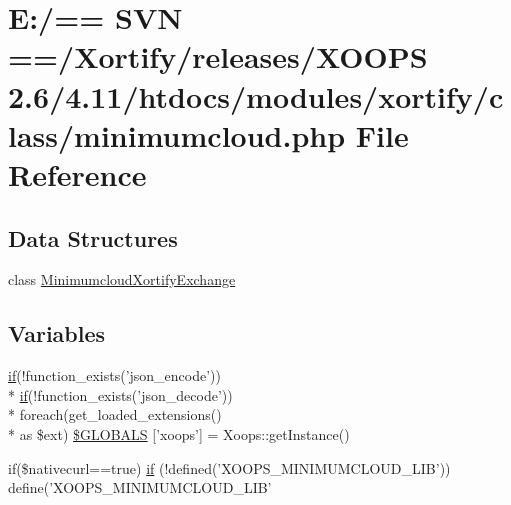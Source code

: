 \hypertarget{minimumcloud_8php}{\section{E\-:/== S\-V\-N ==/\-Xortify/releases/\-X\-O\-O\-P\-S 2.6/4.11/htdocs/modules/xortify/class/minimumcloud.php File Reference}
\label{minimumcloud_8php}
}
\subsection*{Data Structures}
\begin{DoxyCompactItemize}
\item 
class \hyperlink{class_minimumcloud_xortify_exchange}{Minimumcloud\-Xortify\-Exchange}
\end{DoxyCompactItemize}
\subsection*{Variables}
\begin{DoxyCompactItemize}
\item 
\hyperlink{poll_2index_8php_ae404acbb304be6b6ac443de921697faf}{if}(!function\-\_\-exists('json\-\_\-encode')) \\*
\hyperlink{poll_2index_8php_ae404acbb304be6b6ac443de921697faf}{if}(!function\-\_\-exists('json\-\_\-decode')) \\*
foreach(get\-\_\-loaded\-\_\-extensions() \\*
as \$ext) \hyperlink{minimumcloud_8php_adf2565575f9f929aa494be5a87b37b20}{\$\-G\-L\-O\-B\-A\-L\-S} \mbox{[}'xoops'\mbox{]} = Xoops\-::get\-Instance()
\item 
if(\$nativecurl==true) \hyperlink{minimumcloud_8php_aa49fda3cc7e19124c0d4107259577ad1}{if} (!defined('X\-O\-O\-P\-S\-\_\-\-M\-I\-N\-I\-M\-U\-M\-C\-L\-O\-U\-D\-\_\-\-L\-I\-B')) define('X\-O\-O\-P\-S\-\_\-\-M\-I\-N\-I\-M\-U\-M\-C\-L\-O\-U\-D\-\_\-\-L\-I\-B'
\end{DoxyCompactItemize}


